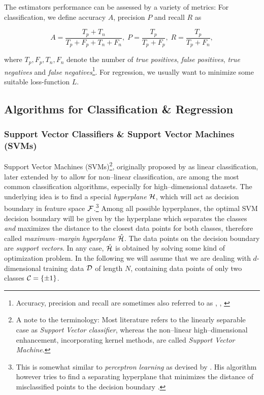 The estimators performance can be assessed by a variety of metrics: For classification, we define accuracy $A$, precision $P$ and recall $R$ as

\begin{equation}
A = \frac{T_p + T_n}{T_p + F_p + T_n + F_n}, \; P = \frac{T_p}{T_p + F_p}, \; R = \frac{T_p}{T_p + F_n},
\end{equation}

where $T_p, F_p, T_n, F_n$ denote the number of \emph{true positives}, \emph{false positives}, \emph{true negatives} and \emph{false negatives}\todo{}\footnote{Accuracy, precision and recall are sometimes also referred to as \emph{}, \emph{}, \emph{}}. For regression, we usually want to minimize some suitable loss-function $L$.

\subsection{Algorithms for Classification \& Regression}
\subsubsection{Support Vector Classifiers \& Support Vector Machines (SVMs)}

Support Vector Machines (SVMs)\footnote{A note to the terminology: Most literature refers to the linearly separable case as \emph{Support Vector classifier}, whereas the non--linear high--dimensional enhancement, incorporating kernel methods, are called \emph{Support Vector Machine}.}, originally proposed by \citet{vapnik1963} as linear classification, later extended by \citet{cortes1995} to allow for non--linear classification, are among the most common classification algorithms, especially for high--dimensional datasets. The underlying idea is to find a special \emph{hyperplane} $\mathcal{H}$, which will act as decision boundary in feature space $\mathcal{F}$.\footnote{This is somewhat similar to \emph{perceptron learning} as devised by \citet{rosenblatt1958}. His algorithm however tries to find a separating hyperplane that minimizes the distance of misclassified points to the decision boundary \citep{hastie2001}.} Among all possible hyperplanes, the optimal SVM decision boundary will be given by the hyperplane which separates the classes \emph{and} maximizes the distance to the closest data points for both classes, therefore called \emph{maximum--margin hyperplane} $\hat {\mathcal{H}}$. The data points on the decision boundary are \emph{support vectors}. In any case, $\hat {\mathcal{H}}$ is obtained by solving some kind of optimization problem. In the following we will assume that we are dealing with $d$-dimensional training data $\mathcal{D}$ of length $N$, containing data points of only two classes $\mathcal{C} = \{ \pm 1 \}$. \\

